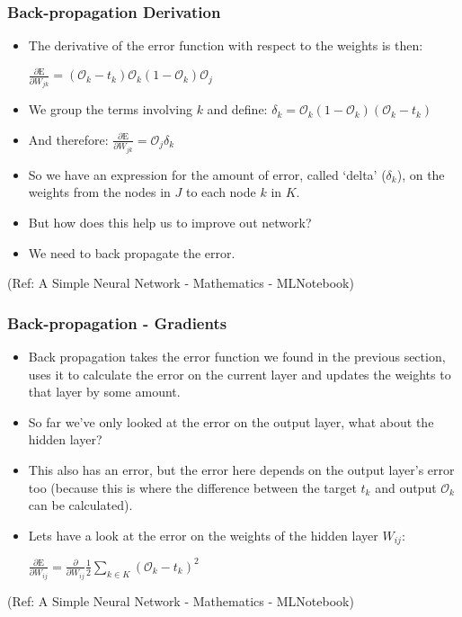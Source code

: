 \begin{frame}[fragile] \frametitle{Back-propagation Derivation}

\begin{itemize}
\item The derivative of the error function with respect to the weights is then: 

$\frac{\partial{\text{E}}}{\partial{W_{jk}}}  =\left( \mathcal{O}_{k} - t_{k} \right) \mathcal{O}_{k}  \left( 1 - \mathcal{O}_{k}  \right) \mathcal{O}_{j}$

\item We group the terms involving $k$ and define: $\delta_{k} = \mathcal{O}_{k}  \left( 1 - \mathcal{O}_{k}  \right)  \left( \mathcal{O}_{k} - t_{k} \right)$

\item And therefore: $\frac{\partial{\text{E}}}{\partial{W_{jk}}}  = \mathcal{O}_{j} \delta_{k}$

\item So we have an expression for the amount of error, called ‘delta' ($\delta_{k}$), 
on the weights from the nodes in $J$ to each node $k$ in $K$. 
\item But how does this help us to improve out network?
\item We need to back propagate the error.
\end{itemize}

\tiny{(Ref: A Simple Neural Network - Mathematics - MLNotebook)}
\end{frame}

\begin{frame}[fragile] \frametitle{Back-propagation - Gradients}

\begin{itemize}
\item Back propagation takes the error function we found in the previous section, uses it to calculate the error on the current layer and updates the weights to that layer by some amount.
\item So far we’ve only looked at the error on the output layer, what about the hidden layer? 
\item This also has an error, but the error here depends on the output layer’s error too (because this is where the difference between the target $t_k$ and output $\mathcal{O}_{k}$ can be calculated). 
\item Lets have a look at the error on the weights of the hidden layer $W_{ij}$:

$\frac{\partial{\text{E}}}{\partial{W_{ij}}} =  \frac{\partial{}}{\partial{W_{ij}}}  \frac{1}{2} \sum_{k \in K} \left( \mathcal{O}_{k} - t_{k} \right)^{2}$

\end{itemize}

\tiny{(Ref: A Simple Neural Network - Mathematics - MLNotebook)}
\end{frame}

